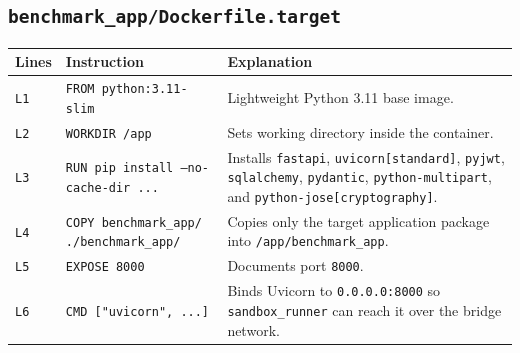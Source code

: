 \documentclass[11pt,a4paper]{article}
\begin{document}
\subsection{\texttt{benchmark\_app/Dockerfile.target}}
\begin{longtable}{L{1.4cm} L{5.2cm} L{9.0cm}}
\toprule
\textbf{Lines} & \textbf{Instruction} & \textbf{Explanation} \\
\midrule
\endhead
\texttt{L1} & \texttt{FROM python:3.11-slim} & Lightweight Python 3.11 base image. \\
\texttt{L2} & \texttt{WORKDIR /app} & Sets working directory inside the container. \\
\texttt{L3} & \texttt{RUN pip install --no-cache-dir ...} & Installs \texttt{fastapi}, \texttt{uvicorn[standard]}, \texttt{pyjwt}, \texttt{sqlalchemy}, \texttt{pydantic}, \texttt{python-multipart}, and \texttt{python-jose[cryptography]}. \\
\texttt{L4} & \texttt{COPY benchmark\_app/ ./benchmark\_app/} & Copies only the target application package into \texttt{/app/benchmark\_app}. \\
\texttt{L5} & \texttt{EXPOSE 8000} & Documents port \texttt{8000}. \\
\texttt{L6} & \texttt{CMD ["uvicorn", ...]} & Binds Uvicorn to \texttt{0.0.0.0:8000} so \texttt{sandbox\_runner} can reach it over the bridge network. \\
\bottomrule
\end{longtable}

\end{document}
